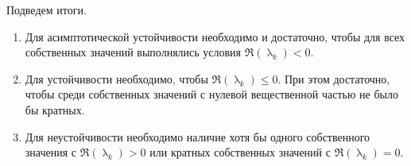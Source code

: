 \documentclass[../../calc-math-exam-2023.tex]{subfiles}
\begin{document}
    Подведем итоги.
    \begin{enumerate}
        \item Для асимптотической устойчивости необходимо и достаточно, чтобы для всех собственных значений
        выполнялись условия $\Re(\uplambda_k) < 0$.
        \item Для устойчивости необходимо, чтобы $\Re(\uplambda_k) \leq 0$. При этом достаточно, чтобы
        среди собственных значений с нулевой вещественной частью не было бы кратных.
        \item Для неустойчивости необходимо наличие хотя бы одного собственного значения с $\Re(\uplambda_k) > 0$
        или кратных собственных значений с $\Re(\uplambda_k) = 0$.
    \end{enumerate}
    \vspace{10pt}
\end{document}
